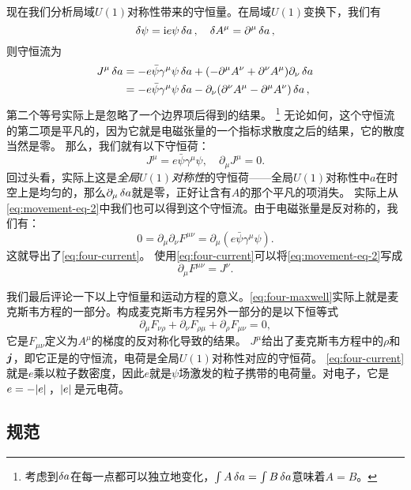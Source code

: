 现在我们分析局域$U(1)$对称性带来的守恒量。在局域$U(1)$变换下，我们有
\[
    \var{\psi} = \mathrm{i} e \psi \var{a}, \quad \var{A^\mu} = \partial^\mu \var{a},
\]
则守恒流为
\[
    \begin{aligned}
        J^\mu \var{a} &= - e \bar{\psi} \gamma^\mu \psi \var{a} + (-\partial^\mu A^\nu + \partial^\nu A^\mu) \partial_\nu \var{a} \\
        &= - e \bar{\psi} \gamma^\mu \psi \var{a} - \partial_\nu (\partial^\nu A^\mu - \partial^\mu A^\nu) \var{a},
    \end{aligned}
\]
第二个等号实际上是忽略了一个边界项后得到的结果。%
\footnote{考虑到$\var{a}$在每一点都可以独立地变化，$\int A\var{a} = \int B \var{a}$意味着$A=B$。}%
无论如何，这个守恒流的第二项是平凡的，因为它就是电磁张量的一个指标求散度之后的结果，它的散度当然是零。
那么，我们就有以下守恒荷：
\begin{equation}
    J^\mu = e \bar{\psi} \gamma^\mu \psi , \quad \partial_\mu J^\mu = 0.
    \label{eq:four-current}
\end{equation}
回过头看，实际上这是\emph{全局$U(1)$对称性}的守恒荷——全局$U(1)$对称性中$a$在时空上是均匀的，那么$\partial_\mu \var{a}$就是零，正好让含有$A$的那个平凡的项消失。
实际上从\eqref{eq:movement-eq-2}中我们也可以得到这个守恒流。由于电磁张量是反对称的，我们有：
\[
    0 = \partial_\mu \partial_\nu F^{\mu \nu} = \partial_\mu (e \bar{\psi} \gamma^\mu \psi).
\]
这就导出了\eqref{eq:four-current}。
使用\eqref{eq:four-current}可以将\eqref{eq:movement-eq-2}写成
\begin{equation}
    \partial_\mu F^{\mu \nu} = J^\nu.
    \label{eq:four-maxwell}
\end{equation}

我们最后评论一下以上守恒量和运动方程的意义。\eqref{eq:four-maxwell}实际上就是麦克斯韦方程的一部分。构成麦克斯韦方程另外一部分的是以下恒等式
\begin{equation}
    \partial_\mu F_{\nu \rho} + \partial_\nu F_{\rho \mu} + \partial_\rho F_{\mu \nu} = 0,
    \label{eq:bianchi-identity}
\end{equation}
它是$F_{\mu \nu}$定义为$A^\mu$的梯度的反对称化导致的结果。%
$J^\mu$给出了麦克斯韦方程中的$\rho$和$\vb*{j}$，即它正是的守恒流，电荷是全局$U(1)$对称性对应的守恒荷。
\eqref{eq:four-current}就是$e$乘以粒子数密度，因此$e$就是$\psi$场激发的粒子携带的电荷量。对电子，它是$e = -\abs*{e}$，$\abs*{e}$是元电荷。

\subsection{规范}\label{sec:gauge-def}

